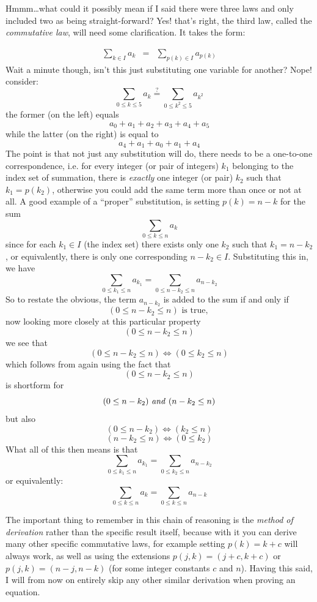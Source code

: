 \documentclass[twoside]{article}
\begin{document}
Hmmm\ldots what could it possibly mean if I said there were
three laws and only included two as being straight-forward?
Yes! that's right, the third law, called the 
\emph{commutative law}, will need some clarification.  
It takes the form:

\begin{eqnarray}
\sum_{k\in I}a_k & = & \sum_{p(k)\in I}\!\!\! a_{p(k)}
\end{eqnarray}Wait a minute though, isn't this just
substituting one variable for another?  Nope! consider:
$$  \sum_{0\le k\le 5}\!\!\! a_k\stackrel{?}{=}
\sum_{0\le k^2\le 5}\!\!\!\! a_{k^2}  $$
the former (on the left) equals $$  a_0+a_1+a_2+a_3+a_4+a_5  $$
while the latter (on the right) is equal to $$  a_{4}+a_{1}+a_0+a_1+a_4  $$
The point is that not just any substitution will do,
there needs to be a one-to-one correspondence, i.e. for
every integer (or pair of integers) $  k_1  $ belonging to 
the index set of summation, there is \emph{exactly} one 
integer (or pair) $  k_2  $ such that $  k_1=p(k_2)  $, 
otherwise you could add the same term more than once or 
not at all.  A good example of a ``proper'' substitution, 
is setting $  p(k)=n-k  $ for the sum
$$  \sum_{0\le k\le n}\!\!\! a_k  $$ 
since for each $  k_1\in I  $ (the index set)
there exists only one $  k_2  $ such that $  k_1=n-k_2  $,
or equivalently, there is only one corresponding
$  n-k_2\in I  $. Substituting this in, we have
$$  \sum_{0\le k_1\le n}\!\!\!\! a_{k_1}
 =\sum_{0\le n-k_2\le n}\!\!\!\!\!\!\! a_{n-k_2}  $$
So to restate the obvious, the term $  a_{n-k_2}  $ is 
added to the sum if and only if 
$$  (0\le n-k_2\le n)\mbox{ is true, }  $$ 
now looking more closely at this particular property 
$$  (0\le n-k_2\le n)  $$ we see that
$$  (0\le n-k_2\le n)\Longleftrightarrow (0\le k_2\le n)  $$
which follows from again using the fact that
$$  (0\le n-k_2\le n)  $$ is shortform for
$$  (0\le n-k_2)\mbox{ \emph{and} }(n-k_2\le n)  $$
but also
$$  (0\le n-k_2)\Longleftrightarrow (k_2\le n)  $$
$$  (n-k_2\le n)\Longleftrightarrow (0\le k_2)  $$ 
What all of this then means is that
$$  \sum_{0\le k_1\le n}\!\!\!\! a_{k_1}
=\sum_{0\le k_2\le n}\!\!\!\! a_{n-k_2}  $$ or equivalently:
$$  \sum_{0\le k\le n}\!\!\! a_{k}
=\sum_{0\le k\le n}\!\!\! a_{n-k}  $$

The important thing to remember in this chain of reasoning is 
the \emph{method of derivation} rather than the specific result 
itself, because with it you can derive many other specific 
commutative laws, for example setting \mbox{$  p(k)=k+c  $} will 
always work, as well as using the extensions 
\mbox{$  p(j,k)=(j+c,k+c)  $} or \mbox{$  p(j,k)=(n-j,n-k)  $} 
(for some integer constants $  c  $ and $  n  $).  Having this 
said, I will from now on entirely skip any other similar 
derivation when proving an equation.
\end{document}
